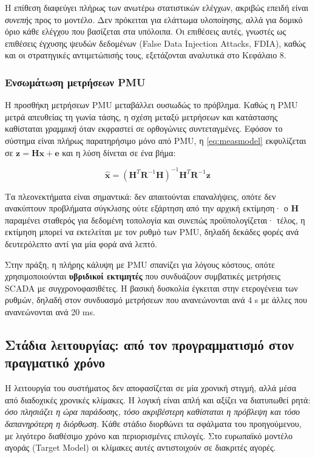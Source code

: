Η επίθεση διαφεύγει πλήρως των ανωτέρω στατιστικών ελέγχων, ακριβώς επειδή είναι
\emph{συνεπής} προς το μοντέλο. Δεν πρόκειται για ελάττωμα υλοποίησης, αλλά για δομικό όριο
κάθε ελέγχου που βασίζεται στα υπόλοιπα. Οι επιθέσεις αυτές, γνωστές ως επιθέσεις έγχυσης
ψευδών δεδομένων (False Data Injection Attacks, FDIA), καθώς και οι στρατηγικές
αντιμετώπισής τους, εξετάζονται αναλυτικά στο Κεφάλαιο 8.

\subsubsection*{Ενσωμάτωση μετρήσεων PMU}

Η προσθήκη μετρήσεων PMU μεταβάλλει ουσιωδώς το πρόβλημα. Καθώς η PMU μετρά απευθείας τη
γωνία τάσης, η σχέση μεταξύ μετρήσεων και κατάστασης καθίσταται \emph{γραμμική} όταν
εκφραστεί σε ορθογώνιες συντεταγμένες. Εφόσον το σύστημα είναι πλήρως παρατηρήσιμο μόνο
από PMU, η \eqref{eq:measmodel} εκφυλίζεται σε
$\mathbf{z} = \mathbf{H}\mathbf{x} + \mathbf{e}$ και η λύση δίνεται σε ένα βήμα:

\begin{equation}
\hat{\mathbf{x}} = \left(\mathbf{H}^{T}\mathbf{R}^{-1}\mathbf{H}\right)^{-1}
                    \mathbf{H}^{T}\mathbf{R}^{-1}\mathbf{z}
\label{eq:linse}
\end{equation}

Τα πλεονεκτήματα είναι σημαντικά: δεν απαιτούνται επαναλήψεις, οπότε δεν ανακύπτουν
προβλήματα σύγκλισης ούτε εξάρτηση από την αρχική εκτίμηση· ο $\mathbf{H}$ παραμένει
σταθερός για δεδομένη τοπολογία και συνεπώς προϋπολογίζεται· τέλος, η εκτίμηση μπορεί να
εκτελείται με τον ρυθμό των PMU, δηλαδή δεκάδες φορές ανά δευτερόλεπτο αντί για μία φορά
ανά λεπτό.

Στην πράξη, η πλήρης κάλυψη με PMU σπανίζει για λόγους κόστους, οπότε χρησιμοποιούνται
\textbf{υβριδικοί εκτιμητές} που συνδυάζουν συμβατικές μετρήσεις SCADA με
συγχρονοφασιθέτες. Η βασική δυσκολία έγκειται στην ετερογένεια των ρυθμών, δηλαδή στον
συνδυασμό μετρήσεων που ανανεώνονται ανά 4 s με άλλες που ανανεώνονται ανά 20 ms.

\subsection{Στάδια λειτουργίας: από τον προγραμματισμό στον πραγματικό χρόνο}

Η λειτουργία του συστήματος δεν αποφασίζεται σε μία χρονική στιγμή, αλλά μέσα από
διαδοχικές χρονικές κλίμακες. Η λογική είναι απλή και αξίζει να διατυπωθεί ρητά: \emph{όσο
πλησιάζει η ώρα παράδοσης, τόσο ακριβέστερη καθίσταται η πρόβλεψη και τόσο δαπανηρότερη η
διόρθωση}. Κάθε στάδιο διορθώνει τα σφάλματα του προηγούμενου, με λιγότερο διαθέσιμο χρόνο
και περιορισμένες επιλογές. Στο ευρωπαϊκό μοντέλο αγοράς (Target Model) οι κλίμακες αυτές
αντιστοιχούν σε διακριτές αγορές.

